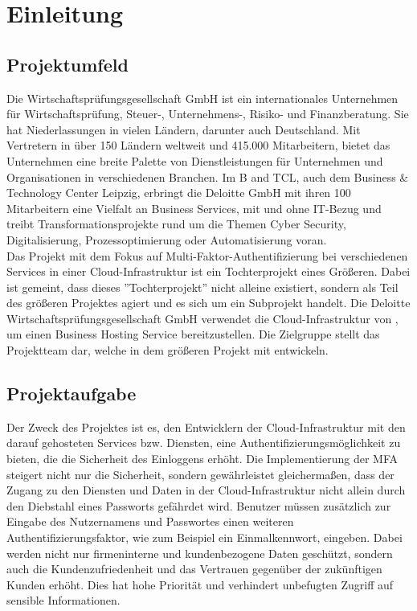 
\section{Einleitung}
\label{sec:Einleitung}

\subsection{Projektumfeld} 
\label{sec:Projektumfeld}
Die \cite{Deloitte} Wirtschaftsprüfungsgesellschaft GmbH ist ein internationales 
Unternehmen für Wirtschaftsprüfung, Steuer-, Unternehmens-, Risiko- und Finanzberatung.
Sie hat Niederlassungen in vielen Ländern, darunter auch Deutschland. 
Mit Vertretern in über 150 Ländern weltweit und 415.000 Mitarbeitern, bietet das Unternehmen eine breite Palette 
von Dienstleistungen für Unternehmen und Organisationen in verschiedenen Branchen.
Im \acs{B and TCL}, auch dem Business \& Technology Center Leipzig, erbringt die Deloitte
GmbH mit ihren 100 Mitarbeitern eine Vielfalt an Business Services, mit und ohne IT-Bezug und treibt
Transformationsprojekte rund um die Themen Cyber Security, Digitalisierung,
Prozessoptimierung oder Automatisierung voran. 
\\Das Projekt mit dem Fokus auf Multi-Faktor-Authentifizierung bei verschiedenen Services in einer 
Cloud-Infrastruktur ist ein Tochterprojekt eines Größeren. Dabei ist gemeint, dass dieses 
''Tochterprojekt'' nicht alleine existiert, sondern als Teil des größeren Projektes agiert und es sich 
um ein Subprojekt handelt. Die Deloitte Wirtschaftsprüfungsgesellschaft GmbH verwendet die 
Cloud-Infrastruktur von \cite{ovhcloud}, um einen Business Hosting Service bereitzustellen.
Die Zielgruppe stellt das Projektteam dar, welche in dem größeren Projekt mit entwickeln.

\subsection{Projektaufgabe}
\label{sec:Projektaufgabe}
Der Zweck des Projektes ist es, den Entwicklern der Cloud-Infrastruktur mit den darauf gehosteten Services bzw. 
Diensten, eine Authentifizierungsmöglichkeit zu bieten, die die Sicherheit des Einloggens erhöht.
Die Implementierung der \acs{MFA} steigert nicht nur die Sicherheit, sondern gewährleistet gleichermaßen, 
dass der Zugang zu den Diensten und Daten in der Cloud-Infrastruktur nicht allein durch den Diebstahl eines 
Passworts gefährdet wird. Benutzer müssen zusätzlich zur Eingabe des Nutzernamens und Passwortes einen weiteren 
Authentifizierungsfaktor, wie zum Beispiel ein Einmalkennwort, eingeben. Dabei werden nicht nur firmeninterne und 
kundenbezogene Daten geschützt, sondern auch die Kundenzufriedenheit und das Vertrauen gegenüber der zukünftigen 
Kunden erhöht. Dies hat hohe Priorität und verhindert unbefugten Zugriff auf sensible Informationen.

